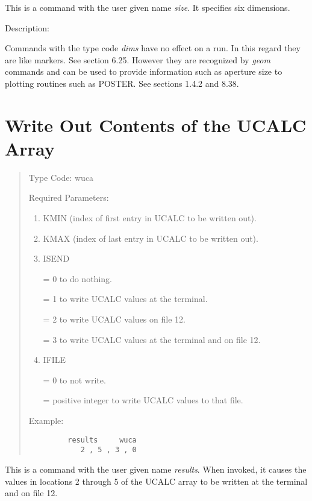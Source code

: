 This is a command with the user given name {\em size}.  It specifies six dimensions.

\vspace{5mm}
     Description:
\vspace{2mm}

Commands with the type code {\em dims} have no effect on a \Mary run.  In this regard they are like markers.  See section 6.25.  However they are recognized by {\em geom} commands and can be used to provide information such as aperture size to plotting routines such as POSTER.  See sections 1.4.2 and 8.38.

\newpage
\section{Write Out Contents of the UCALC Array}
\begin{quotation}
\noindent Type Code:  wuca
\vspace{5mm}

\noindent Required Parameters:
\begin{enumerate}
      \item  KMIN (index of first entry in UCALC to be written out).

	  \item  KMAX (index of last entry in UCALC to be written out).

      \item  ISEND

             = 0 to do nothing.

             = 1 to write UCALC values at the terminal.

			 = 2 to write UCALC values on file 12.

			 = 3 to write UCALC values at the terminal and on file 12.
      \item  IFILE

	         = 0 to not write.

			 = positive integer to write UCALC values to that file.
\end{enumerate}

\vspace{5mm}
\noindent Example:
\begin{verbatim}
         results     wuca
            2 , 5 , 3 , 0
\end{verbatim}
\end{quotation}

This is a command with the user given name {\em results}.  When invoked, it causes the values in locations 2 through 5 of the UCALC array to be written at the terminal and on file 12.

